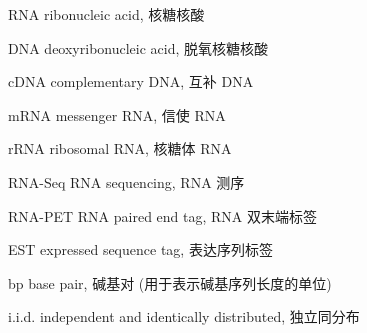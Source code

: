 \begin{denotation}

\item[RNA] ribonucleic acid, 核糖核酸

\item[DNA] deoxyribonucleic acid, 脱氧核糖核酸

\item[cDNA] complementary DNA, 互补 DNA

\item[mRNA] messenger RNA, 信使 RNA

\item[rRNA] ribosomal RNA, 核糖体 RNA

\item[RNA-Seq] RNA sequencing, RNA 测序

\item[RNA-PET] RNA paired end tag, RNA 双末端标签

\item[EST] expressed sequence tag, 表达序列标签

\item[bp] base pair, 碱基对 (用于表示碱基序列长度的单位)

\item[i.i.d.] independent and identically distributed, 独立同分布

\end{denotation}
